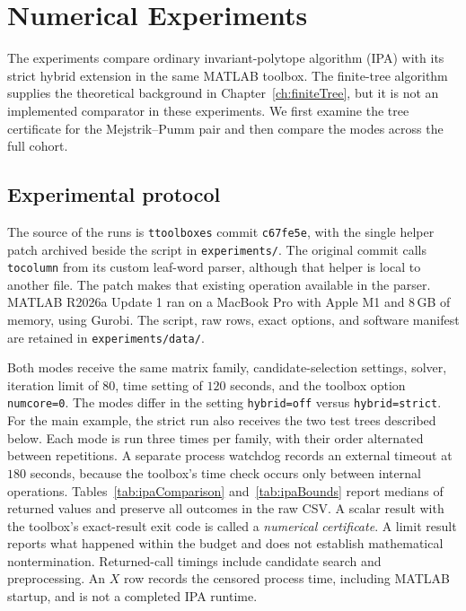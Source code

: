 \chapter{Numerical Experiments}
\label{ch:numericalTesting}

The experiments compare ordinary invariant-polytope algorithm (IPA) with its strict hybrid extension in the same MATLAB toolbox.
The finite-tree algorithm supplies the theoretical background in Chapter~\ref{ch:finiteTree}, but it is not an implemented comparator in these experiments.
We first examine the tree certificate for the Mejstrik--Pumm pair and then compare the modes across the full cohort.

\section{Experimental protocol}
\label{sec:numericsProtocol}
The source of the runs is \texttt{ttoolboxes} commit \texttt{c67fe5e}, with the single helper patch archived beside the script in \texttt{experiments/}.
The original commit calls \texttt{tocolumn} from its custom leaf-word parser, although that helper is local to another file.
The patch makes that existing operation available in the parser.
MATLAB R2026a Update 1 ran on a MacBook Pro with Apple M1 and 8\,GB of memory, using Gurobi.
The script, raw rows, exact options, and software manifest are retained in \texttt{experiments/data/}.

Both modes receive the same matrix family, candidate-selection settings, solver, iteration limit of $80$, time setting of $120$ seconds, and the toolbox option \texttt{numcore=0}.
The modes differ in the setting \texttt{hybrid=off} versus \texttt{hybrid=strict}.
For the main example, the strict run also receives the two test trees described below.
Each mode is run three times per family, with their order alternated between repetitions.
A separate process watchdog records an external timeout at $180$ seconds, because the toolbox's time check occurs only between internal operations.
Tables~\ref{tab:ipaComparison} and~\ref{tab:ipaBounds} report medians of returned values and preserve all outcomes in the raw CSV.
A scalar result with the toolbox's exact-result exit code is called a \emph{numerical certificate}.
A limit result reports what happened within the budget and does not establish mathematical nontermination.
Returned-call timings include candidate search and preprocessing.
An $X$ row records the censored process time, including MATLAB startup, and is not a completed IPA runtime.

